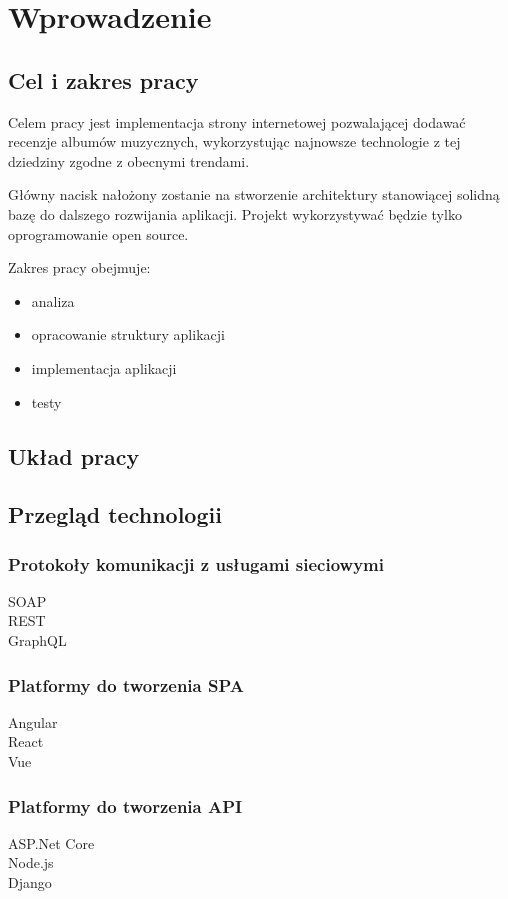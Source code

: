 \chapter{Wprowadzenie}
\section{Cel i zakres pracy}
	Celem pracy jest implementacja strony internetowej pozwalającej dodawać recenzje albumów muzycznych,
	wykorzystując najnowsze technologie z tej dziedziny zgodne z obecnymi trendami.

	Główny nacisk nałożony zostanie na stworzenie architektury stanowiącej solidną bazę do dalszego rozwijania aplikacji.
	Projekt wykorzystywać będzie tylko oprogramowanie open source.

	Zakres pracy obejmuje:
	\begin{itemize}
		\item analiza 
		\item opracowanie struktury aplikacji
		\item implementacja aplikacji
		\item testy 
	\end{itemize}
	
\section{Układ pracy}

\section{Przegląd technologii}
	\subsection{Protokoły komunikacji z usługami sieciowymi}
		\begin{description}
			\item[SOAP]
			\item[REST] 
			\item[GraphQL] 
		\end{description}

	\subsection{Platformy do tworzenia SPA}
		\begin{description}
			\item[Angular]
			\item[React] 
			\item[Vue] 
		\end{description}

	\subsection{Platformy do tworzenia API}
		\begin{description}
			\item[ASP.Net Core]
			\item[Node.js] 
			\item[Django] 
		\end{description}